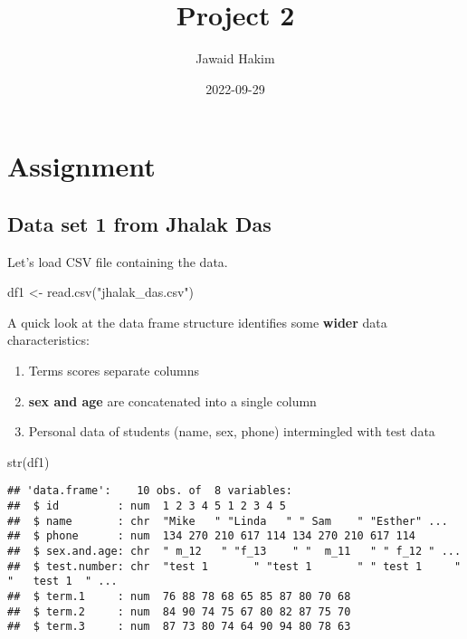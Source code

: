 \documentclass[
]{article}
\title{Project 2}
\author{Jawaid Hakim}
\date{2022-09-29}
\newenvironment{Shaded}{\begin{snugshade}}{\end{snugshade}}
\newcommand{\FunctionTok}[1]{\textcolor[rgb]{0.00,0.00,0.00}{#1}}
\newcommand{\NormalTok}[1]{#1}
\newcommand{\OtherTok}[1]{\textcolor[rgb]{0.56,0.35,0.01}{#1}}
\newcommand{\StringTok}[1]{\textcolor[rgb]{0.31,0.60,0.02}{#1}}
\providecommand{\tightlist}{%
  \setlength{\itemsep}{0pt}\setlength{\parskip}{0pt}}
\begin{document}
\maketitle

{
\hypersetup{linkcolor=}
\setcounter{tocdepth}{3}
\tableofcontents
}
\hypertarget{assignment}{%
\section{Assignment}\label{assignment}}

\hypertarget{data-set-1-from-jhalak-das}{%
\subsection{Data set 1 from Jhalak
Das}\label{data-set-1-from-jhalak-das}}

Let's load CSV file containing the data.

\begin{Shaded}
\begin{Highlighting}[]
\NormalTok{df1 }\OtherTok{\textless{}{-}} \FunctionTok{read.csv}\NormalTok{(}\StringTok{"jhalak\_das.csv"}\NormalTok{)}
\end{Highlighting}
\end{Shaded}

A quick look at the data frame structure identifies some \textbf{wider}
data characteristics:

\begin{enumerate}
\def\labelenumi{\arabic{enumi}.}
\tightlist
\item
  Terms scores separate columns
\item
  \textbf{sex and age} are concatenated into a single column
\item
  Personal data of students (name, sex, phone) intermingled with test
  data
\end{enumerate}

\begin{Shaded}
\begin{Highlighting}[]
\FunctionTok{str}\NormalTok{(df1)}
\end{Highlighting}
\end{Shaded}

\begin{verbatim}
## 'data.frame':    10 obs. of  8 variables:
##  $ id         : num  1 2 3 4 5 1 2 3 4 5
##  $ name       : chr  "Mike   " "Linda   " " Sam    " "Esther" ...
##  $ phone      : num  134 270 210 617 114 134 270 210 617 114
##  $ sex.and.age: chr  " m_12   " "f_13    " "  m_11   " " f_12 " ...
##  $ test.number: chr  "test 1       " "test 1       " " test 1     " "   test 1  " ...
##  $ term.1     : num  76 88 78 68 65 85 87 80 70 68
##  $ term.2     : num  84 90 74 75 67 80 82 87 75 70
##  $ term.3     : num  87 73 80 74 64 90 94 80 78 63
\end{verbatim}
\end{document}

